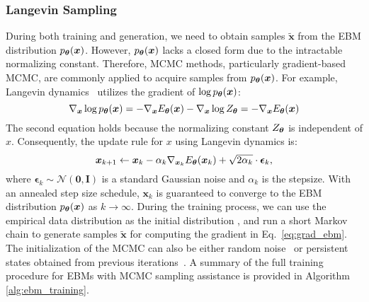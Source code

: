 \subsubsection{Langevin Sampling}
During both training and generation, we need to obtain samples $\widetilde{\bm{x}}$ from the EBM distribution $p_{\bm{\theta}}(\bm{x})$. However, $p_{\bm{\theta}}(\bm{x})$  lacks a closed form due to the intractable normalizing constant. Therefore, MCMC methods, particularly gradient-based MCMC, are commonly applied to acquire samples from $p_{\bm{\theta}}(\bm{x})$. For example, Langevin dynamics~\citep{parisi1981correlation,grenander1994representations,welling2011bayesian} utilizes the gradient of $\log p_{\bm{\theta}}(\bm{x})$:
\begin{equation}
    \nabla_{\bm{x}}\log p_{\bm{\theta}}(\bm{x})=-\nabla_{\bm{x}}E_{\bm{\theta}}(\bm{x})-\nabla_{\bm{x}}\log Z_{\bm{\theta}}=-\nabla_{\bm{x}}E_{\bm{\theta}}(\bm{x})
    \label{eq:gradient_log_p}
\end{equation}
The second equation holds because the normalizing constant $Z_{\bm{\theta}}$ is independent of $x$. Consequently,  the update rule for $x$ using Langevin dynamics is:
\begin{equation}\label{eq:langevin}
    \bm{x}_{k+1} \gets \bm{x}_k-\alpha_k\nabla_{\bm{x}_k}E_{\bm{\theta}}(\bm{x}_k)+\sqrt{2\alpha_k}\cdot\bm{\epsilon}_k,
\end{equation}
where $\bm{\epsilon}_k\sim\mathcal{N}(\bm{0},\bm{I})$ is a standard Gaussian noise and $\alpha_k$ is the stepsize. With an annealed step size schedule, $\bm{x}_k$ is guaranteed to converge to the EBM distribution $p_{\bm{\theta}}(\bm{x})$ as $k\rightarrow\infty$. 
During the training process, we can use the empirical data distribution as the initial distribution \citep{hinton2002training}, and run a short Markov chain to generate samples $\widetilde{\bm{x}}$ for computing the gradient in Eq.~\eqref{eq:grad_ebm}. The initialization of the MCMC can also be either random noise~\citep{nijkamp2019learning} or persistent states obtained from previous iterations~\citep{tieleman2008training}. A summary of the full training procedure for EBMs with MCMC sampling assistance is provided in Algorithm \ref{alg:ebm_training}. 


